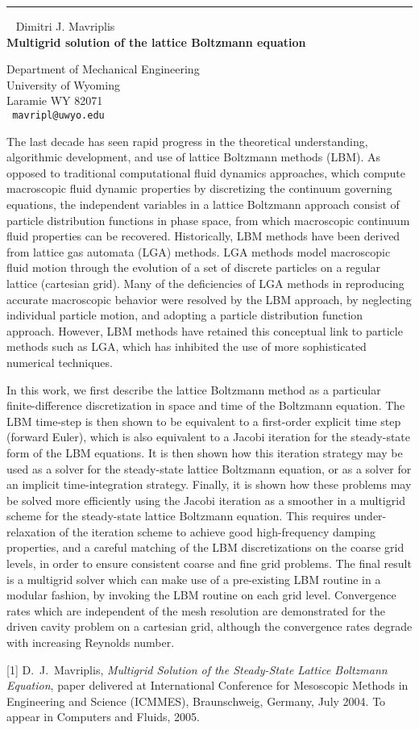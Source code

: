 \documentclass{report}
\begin{document}
\begin{center}

\rule{6in}{1pt} \
{\large
Dimitri J. Mavriplis
\\ {\bf
Multigrid solution of the lattice Boltzmann equation
}}


Department of Mechanical Engineering \\
University of Wyoming \\
Laramie WY 82071 
\\ {\tt
mavripl@uwyo.edu
}
\end{center}

The last decade has seen rapid progress in the theoretical
understanding, algorithmic development, and use of lattice Boltzmann
methods (LBM). As opposed to traditional computational fluid dynamics
approaches, which compute macroscopic fluid dynamic properties by
discretizing the continuum governing equations, the independent
variables in a lattice Boltzmann approach consist of particle
distribution functions in phase space, from which macroscopic continuum
fluid properties can be recovered. Historically, LBM methods have been
derived from lattice gas automata (LGA) methods. LGA methods model
macroscopic fluid motion through the evolution of a set of discrete
particles on a regular lattice (cartesian grid). Many of the
deficiencies of LGA methods in reproducing accurate macroscopic
behavior were resolved by the LBM approach, by neglecting individual
particle motion, and adopting a particle distribution function
approach. However, LBM methods have retained this conceptual link to
particle methods such as LGA, which has inhibited the use of more
sophisticated numerical techniques.

In this work, we first describe the lattice Boltzmann method as a
particular finite-difference discretization in space and time of the
Boltzmann equation. The LBM time-step is then shown to be equivalent to
a first-order explicit time step (forward Euler), which is also
equivalent to a Jacobi iteration for the steady-state form of the LBM
equations. It is then shown how this iteration strategy may be used as
a solver for the steady-state lattice Boltzmann equation, or as a
solver for an implicit time-integration strategy. Finally, it is shown
how these problems may be solved more efficiently using the Jacobi
iteration as a smoother in a multigrid scheme for the steady-state
lattice Boltzmann equation. This requires under-relaxation of the
iteration scheme to achieve good high-frequency damping properties, and
a careful matching of the LBM discretizations on the coarse grid
levels, in order to ensure consistent coarse and fine grid problems.
The final result is a multigrid solver which can make use of a
pre-existing LBM routine in a modular fashion, by invoking the LBM
routine on each grid level. Convergence rates which are independent of
the mesh resolution are demonstrated for the driven cavity problem on a
cartesian grid, although the convergence rates degrade with increasing
Reynolds number.

[1] D.~J.~Mavriplis, {\em Multigrid Solution of the Steady-State Lattice
Boltzmann Equation}, paper delivered at International Conference for
Mesoscopic Methods in Engineering and Science (ICMMES), Braunschweig,
Germany, July 2004. To appear in Computers and Fluids, 2005. 
\end{document}
